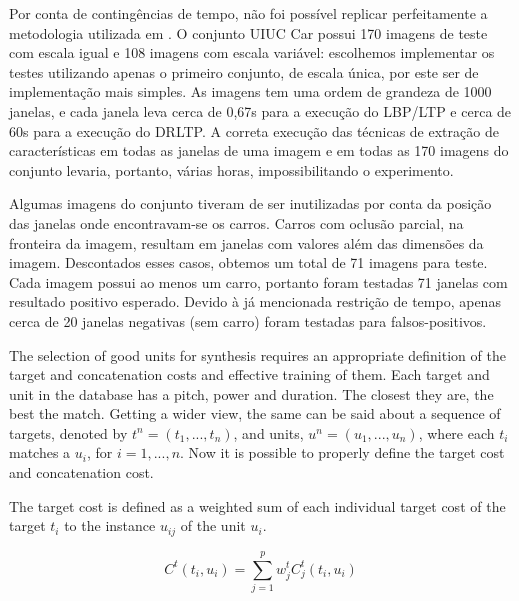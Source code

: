 \documentclass[a4paper,twocolumn]{article}
\begin{document}
Por conta de contingências de tempo, não foi possível replicar perfeitamente a metodologia utilizada em \cite{satpathy}. O conjunto UIUC Car possui 170 imagens de teste com escala igual e 108 imagens com escala variável: escolhemos implementar os testes utilizando apenas o primeiro conjunto, de escala única, por este ser de implementação mais simples. As imagens tem uma ordem de grandeza de 1000 janelas, e cada janela leva cerca de 0,67s para a execução do LBP/LTP e cerca de 60s para a execução do DRLTP. A correta execução das técnicas de extração de características em todas as janelas de uma imagem e em todas as 170 imagens do conjunto levaria, portanto, várias horas, impossibilitando o experimento.

Algumas imagens do conjunto tiveram de ser inutilizadas por conta da posição das janelas onde encontravam-se os carros. Carros com oclusão parcial, na fronteira da imagem, resultam em janelas com valores além das dimensões da imagem. Descontados esses casos, obtemos um total de 71 imagens para teste. Cada imagem possui ao menos um carro, portanto foram testadas 71 janelas com resultado positivo esperado. Devido à já mencionada restrição de tempo, apenas cerca de 20 janelas negativas (sem carro) foram testadas para falsos-positivos.



The selection of good units for synthesis requires an appropriate definition of the target and concatenation costs and effective training of them. Each target and unit in the database has a pitch, power and duration. The closest they are, the best the match. Getting a wider view, the same can be said about a sequence of targets, denoted by $t^n = (t_1, ..., t_n)$, and units, $u^n = (u_1, ..., u_n)$, where each $t_i$ matches a $u_i$, for $i = 1, ..., n$. Now it is possible to properly define the target cost and concatenation cost.

The target cost is defined as a weighted sum of each individual target cost of the target $t_i$ to the instance $u_{ij}$ of the unit $u_i$.

\begin{equation}
    \label{eq:target_cost}
    C^t(t_i,u_i) = \displaystyle\sum_{j=1}^{p} w^t_j C^t_j(t_i,u_i)
\end{equation}
\end{document}
